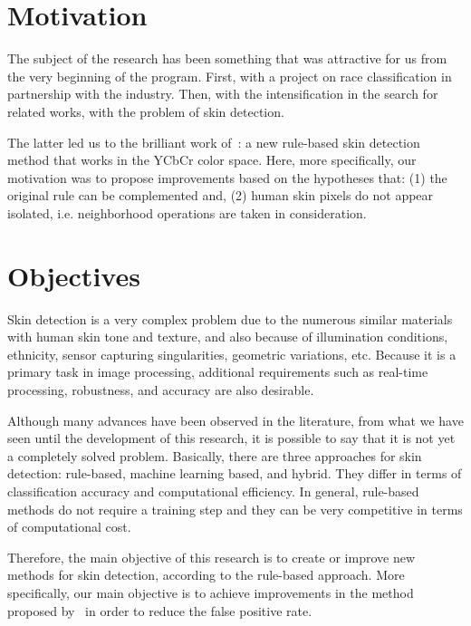 \section{Motivation}
\label{sec:motivation}

The subject of the research has been something that was attractive for us from the very beginning of the program. First, with a project on race classification in partnership with the industry. Then, with the intensification in the search for related works, with the problem of skin detection.

The latter led us to the brilliant work of~\citet{brancati:17}: a new rule-based skin detection method that works in the YCbCr color space. Here, more specifically, our motivation was to propose improvements based on the hypotheses that: (1) the original rule can be complemented and, (2) human skin pixels do not appear isolated, i.e. neighborhood operations are taken in consideration.


\section{Objectives}
\label{sec:objectives}

Skin detection is a very complex problem due to the numerous similar materials with human skin tone and texture, and also because of illumination conditions, ethnicity, sensor capturing singularities, geometric variations, etc. Because it is a primary task in image processing, additional requirements such as real-time processing, robustness, and accuracy are also desirable.

Although many advances have been observed in the literature, from what we have seen until the development of this research, it is possible to say that it is not yet a completely solved problem. Basically, there are three approaches for skin detection: rule-based, machine learning based, and hybrid. They differ in terms of classification accuracy and computational efficiency. In general, rule-based methods do not require a training step and they can be very competitive in terms of computational cost.

Therefore, the main objective of this research is to create or improve new methods for skin detection, according to the rule-based approach. More specifically, our main objective is to achieve improvements in the method proposed by~\citet{brancati:17} in order to reduce the false positive rate.


